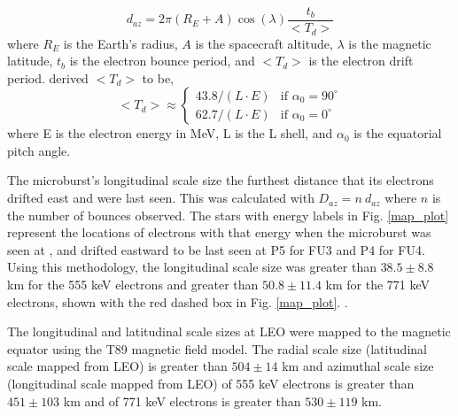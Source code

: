 \documentclass[draft, linenumbers]{agujournal}
\begin{document}
\begin{equation}
d_{az} = 2 \pi (R_E + A) \cos(\lambda) \frac{t_b}{<T_{d}>}
\label{bounce_drift}
\end{equation} where $R_E$ is the Earth's radius, $A$ is the spacecraft altitude, $\lambda$ is the magnetic latitude, $t_b$ is the electron bounce period, and $<T_{d}>$ is the electron drift period. \citet{Parks2003} derived $<T_{d}>$ to be,
\begin{equation}
<T_{d}> \approx
\begin{cases}
43.8 /(L \cdot E) & \text{if } \alpha_0 = 90^{\circ} \\    62.7/(L \cdot E) & \text{if } \alpha_0 = 0^{\circ}
\end{cases}
\label{drift}
\end{equation} where E is the electron energy in MeV, L is the L shell, and $\alpha_0$ is the equatorial pitch angle. 

The microburst's longitudinal scale size  the furthest distance that its electrons drifted east and were last seen. This was calculated with $D_{az} = n \ d_{az}$ where $n$ is the number of bounces observed. The stars with energy labels in Fig. \ref{map_plot} represent the locations of electrons with that energy when the microburst was seen at , and drifted eastward to be last seen at P5 for FU3 and P4 for FU4. Using this methodology, the longitudinal scale size was greater than $ 38.5 \pm 8.8$ km for the 555 keV electrons and greater than $ 50.8 \pm 11.4$ km for the 771 keV electrons, shown with the red dashed box in Fig. \ref{map_plot}. .

The longitudinal and latitudinal scale sizes  at LEO were mapped to the magnetic equator using the T89 magnetic field model. The radial scale size (latitudinal scale mapped from LEO) is greater than $504 \pm​ 14$ km and azimuthal scale size (longitudinal scale mapped from LEO) of 555 keV electrons is greater than $451 \pm 103$ km and of 771 keV electrons is greater than $530 \pm 119$ km.
\end{document}
